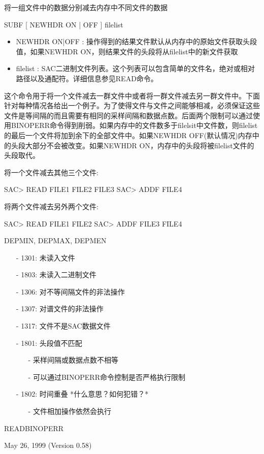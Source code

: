 \label{cmd:subf}

将一组文件中的数据分别减去内存中不同文件的数据

SUBF [ NEWHDR ON | OFF ] filelist

\begin{itemize}
\item NEWHDR ON|OFF : 操作得到的结果文件默认从内存中的原始文件获取头段值，如果NEWHDR ON，则结果文件的头段将从filelist中的新文件获取 
\item filelist : SAC二进制文件列表。这个列表可以包含简单的文件名，绝对或相对路径以及通配符。详细信息参见READ命令。 
\end{itemize}

这个命令用于将一个文件减去一群文件中或者将一群文件减去另一群文件中。下面针对每种情况各给出一个例子。为了使得文件与文件之间能够相减，必须保证这些文件是等间隔的而且需要有相同的采样间隔和数据点数。后面两个限制可以通过使用BINOPERR命令得到削弱。如果内存中的文件数多于filelsit中文件数，则filelist	的最后一个文件将加到余下的全部文件中。如果NEWHDR OFF(默认情况)内存中的头段大部分不会被改变。如果NEWHDR ON，内存中的头段将被filelist文件的头段取代。


将一个文件减去其他三个文件:
\begin{SACCode}
SAC> READ FILE1 FILE2 FILE3
SAC> ADDF FILE4
\end{SACCode}
将两个文件减去另外两个文件:
\begin{SACCode}
SAC> READ FILE1 FILE2
SAC> ADDF FILE3 FILE4
\end{SACCode}

DEPMIN, DEPMAX, DEPMEN

\begin{itemize}
\item[-]1301: 未读入文件
\item[-]1803: 未读入二进制文件
\item[-]1306: 对不等间隔文件的非法操作
\item[-]1307: 对谱文件的非法操作
\item[-]1317: 文件不是SAC数据文件
\item[-]1801: 头段值不匹配
	\begin{itemize}
	\item[-]采样间隔或数据点数不相等
	\item[-]可以通过BINOPERR命令控制是否严格执行限制
	\end{itemize}
\end{itemize}

\begin{itemize}
\item[-]1802: 时间重叠  *什么意思？如何犯错？*
	\begin{itemize}
	\item[-]文件相加操作依然会执行
	\end{itemize}
\end{itemize}

READBINOPERR

May 26, 1999 (Version 0.58)
